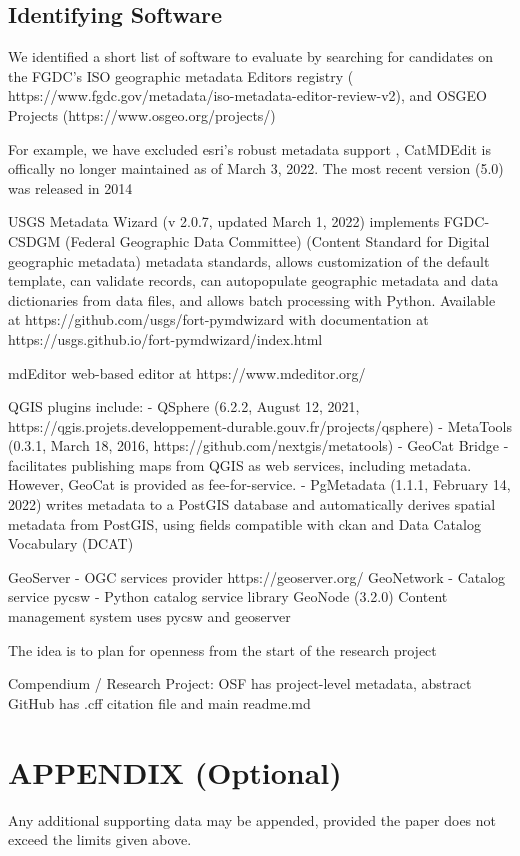 \documentclass{isprs} %
\begin{document}
{
	\begin{spacing}{1.17}
		\normalsize
	\end{spacing}
}

\subsection{Identifying Software}\label{software}

We identified a short list of software to evaluate by searching for candidates on the FGDC's ISO geographic metadata Editors registry ( https://www.fgdc.gov/metadata/iso-metadata-editor-review-v2), and OSGEO Projects (https://www.osgeo.org/projects/)


For example, we have excluded esri's robust metadata support , CatMDEdit is offically no longer maintained as of March 3, 2022. The most recent version (5.0) was released in 2014



USGS Metadata Wizard (v 2.0.7, updated March 1, 2022) implements FGDC-CSDGM (Federal Geographic Data Committee) (Content Standard for Digital geographic metadata) metadata standards, allows customization of the default template, can validate records, can autopopulate geographic metadata and data dictionaries from data files, and allows batch processing with Python. Available at https://github.com/usgs/fort-pymdwizard with documentation at https://usgs.github.io/fort-pymdwizard/index.html

mdEditor web-based editor at https://www.mdeditor.org/ 

QGIS plugins include:
- QSphere (6.2.2, August 12, 2021, https://qgis.projets.developpement-durable.gouv.fr/projects/qsphere)
- MetaTools (0.3.1, March 18, 2016, https://github.com/nextgis/metatools)
- GeoCat Bridge - facilitates publishing maps from QGIS as web services, including metadata. However, GeoCat is provided as fee-for-service.
- PgMetadata (1.1.1, February 14, 2022) writes metadata to a PostGIS database and automatically derives spatial metadata from PostGIS, using fields compatible with ckan and Data Catalog Vocabulary (DCAT)

GeoServer - OGC services provider https://geoserver.org/ 
GeoNetwork - Catalog service
pycsw - Python catalog service library
GeoNode (3.2.0) Content management system uses pycsw and geoserver



The idea is to plan for openness from the start of the research project

Compendium / Research Project:
OSF has project-level metadata, abstract
GitHub has .cff citation file and main readme.md







\section*{APPENDIX (Optional)}\label{APPENDIX}

Any additional supporting data may be appended, provided the paper does not exceed the limits given above. 
\end{document}
